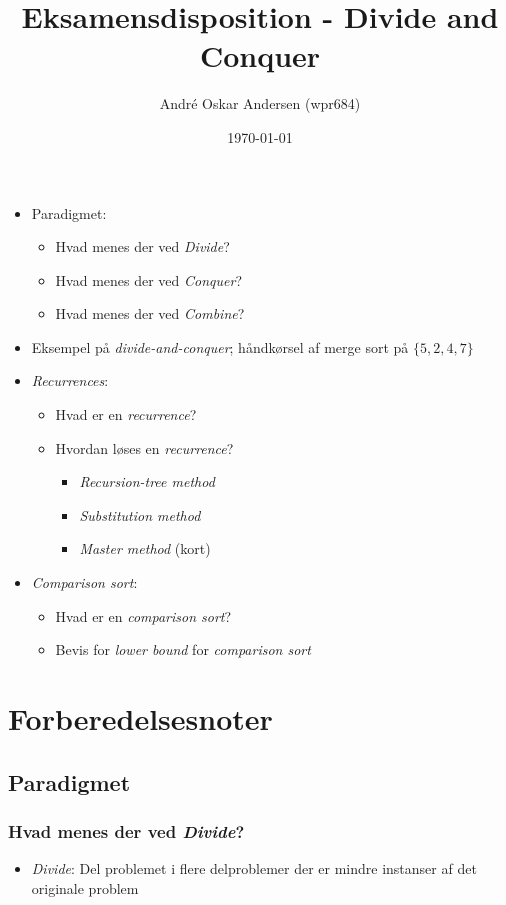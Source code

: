 \documentclass{article}
\title{Eksamensdisposition - Divide and Conquer}
\author{André Oskar Andersen (wpr684)}
\date{\today}
\begin{document}
\maketitle

\begin{itemize}
    \item Paradigmet:
    \begin{itemize}
        \item Hvad menes der ved \textit{Divide}?
        \item Hvad menes der ved \textit{Conquer}?
        \item Hvad menes der ved \textit{Combine}?
    \end{itemize}
    \item Eksempel på \textit{divide-and-conquer}; håndkørsel af merge sort på $\{5, 2, 4, 7\}$
    \item \textit{Recurrences}:
    \begin{itemize}
        \item Hvad er en \textit{recurrence}?
        \item Hvordan løses en \textit{recurrence}?
        \begin{itemize}
            \item \textit{Recursion-tree method}
            \item \textit{Substitution method}
            \item \textit{Master method} (kort)
        \end{itemize}
    \end{itemize}
    \item \textit{Comparison sort}:
    \begin{itemize}
        \item Hvad er en \textit{comparison sort}?
        \item Bevis for \textit{lower bound} for \textit{comparison sort}
    \end{itemize}
\end{itemize}

\newpage

\section*{Forberedelsesnoter}
\subsection*{Paradigmet}
\subsubsection*{Hvad menes der ved \textit{Divide}?}
\begin{itemize}
    \item \textit{Divide}: Del problemet i flere delproblemer der er mindre instanser af det originale problem
\end{itemize}
\end{document}
